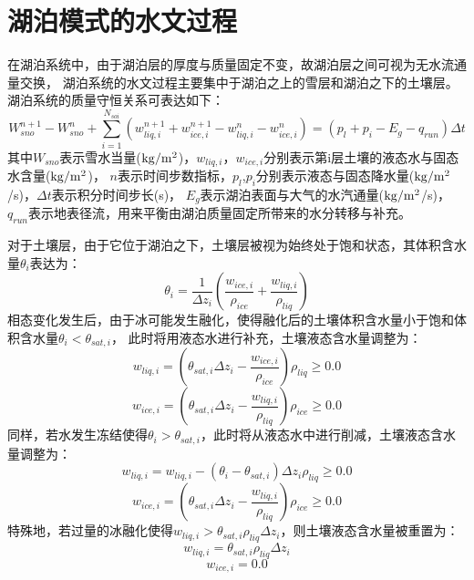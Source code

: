 \section{湖泊模式的水文过程}
在湖泊系统中，由于湖泊层的厚度与质量固定不变，故湖泊层之间可视为无水流通量交换，
湖泊系统的水文过程主要集中于湖泊之上的雪层和湖泊之下的土壤层。
湖泊系统的质量守恒关系可表达如下：
\begin{equation}
W_{sno}^{n+1}-W_{sno}^{n}+\sum_{i=1}^{N_{s o i}}\left(w_{liq, i}^{n+1}+w_{ice, i}^{n+1}-w_{liq, i}^{n}-w_{ice, i}^{n}\right)=\left(p_{l}+p_{i}-E_{g}-q_{r u n}\right) \Delta t
\end{equation}
其中$W_{sno}$表示雪水当量($\rm kg/m^2$)，$w_{liq,i}$，$w_{ice,i}$分别表示第i层土壤的液态水与固态水含量($\rm kg/m^2$)，
$n$表示时间步数指标，$p_l$,$p_i$分别表示液态与固态降水量($\rm kg/m^2$/s)，$\Delta t$表示积分时间步长(s)，
$E_g$表示湖泊表面与大气的水汽通量($\rm kg/m^2$/s)，$q_{run}$表示地表径流，用来平衡由湖泊质量固定所带来的水分转移与补充。


对于土壤层，由于它位于湖泊之下，土壤层被视为始终处于饱和状态，其体积含水量$\theta_i$表达为：
\begin{equation}
\theta_{i}=\frac{1}{\Delta z_{i}}\left(\frac{w_{ice, i}}{\rho_{ice}}+\frac{w_{liq, i}}{\rho_{liq}}\right)
\end{equation}
相态变化发生后，由于冰可能发生融化，使得融化后的土壤体积含水量小于饱和体积含水量$\theta_i<\theta_{sat,i}$，
此时将用液态水进行补充，土壤液态含水量调整为：
\begin{equation}
w_{liq, i}=\left(\theta_{sat,i} \Delta z_{i}-\frac{w_{ice, i}}{\rho_{ice}}\right) \rho_{liq} \geq 0.0
\end{equation}
\begin{equation}
w_{ice, i}=\left(\theta_{sat,i} \Delta z_{i}-\frac{w_{liq, i}}{\rho_{liq}}\right) \rho_{ice} \geq 0.0
\end{equation}
同样，若水发生冻结使得$\theta_i>\theta_{sat,i}$，此时将从液态水中进行削减，土壤液态含水量调整为：
\begin{equation}
w_{liq, i}=w_{liq, i}-\left(\theta_{i}-\theta_{sat,i}\right) \Delta z_{i} \rho_{liq} \geq 0.0
\end{equation}
\begin{equation}
w_{ice, i}=\left(\theta_{sat,i} \Delta z_{i}-\frac{w_{liq, i}}{\rho_{liq}}\right) \rho_{ice} \geq 0.0
\end{equation}
特殊地，若过量的冰融化使得$w_{liq,i}>\theta_{sat,i}\rho_{liq}\Delta z_i$，则土壤液态含水量被重置为：
\begin{equation}
w_{liq, i}=\theta_{sat,i} \rho_{liq} \Delta z_{i}
\end{equation}
\begin{equation}
w_{ice, i}=0.0
\end{equation}

